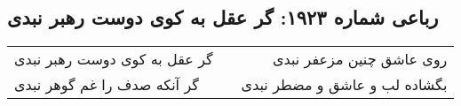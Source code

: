 \begin{center}
\section*{رباعی شماره ۱۹۲۳: گر عقل به کوی دوست رهبر نبدی}
\label{sec:1923}
\begin{longtable}{l p{0.5cm} r}
گر عقل به کوی دوست رهبر نبدی
&&
روی عاشق چنین مزعفر نبدی
\\
گر آنکه صدف را غم گوهر نبدی
&&
بگشاده لب و عاشق و مضطر نبدی
\\
\end{longtable}
\end{center}
